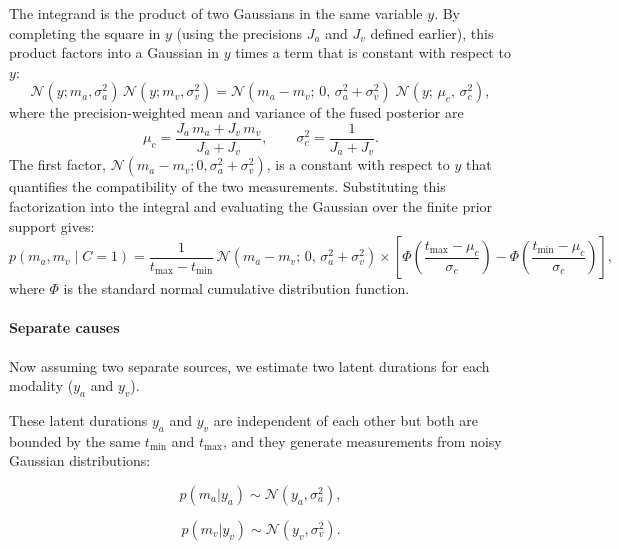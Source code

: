 \documentclass{jov}
\begin{document}
The integrand is the product of two Gaussians in the same variable $y$. By completing the square in $y$ (using the precisions $J_a$ and $J_v$ defined earlier), this product factors into a Gaussian in $y$ times a term that is constant with respect to $y$:
\begin{equation}
\label{eq:product_gaussians_factorization}
\mathcal{N}(y; m_a, \sigma_a^2)\, \mathcal{N}(y; m_v, \sigma_v^2) 
= \mathcal{N}(m_a - m_v;\, 0,\, \sigma_a^2 + \sigma_v^2)\;\mathcal{N}(y;\, \mu_c,\, \sigma_c^2),
\end{equation}
where the precision-weighted mean and variance of the fused posterior are
\begin{equation}
\mu_c = \frac{J_a\, m_a + J_v\, m_v}{J_a + J_v}, 
\qquad
\sigma_c^2 = \frac{1}{J_a + J_v}.
\end{equation}
The first factor, $\mathcal{N}(m_a - m_v; 0, \sigma_a^2 + \sigma_v^2)$, is a constant with respect to $y$ that quantifies the compatibility of the two measurements.  Substituting this factorization into the integral and evaluating the Gaussian over the finite prior support gives:
\begin{equation}
\label{eq:likelihood_c1_final}
p(m_a, m_v \mid C\!=\!1) = \frac{1}{t_{\max} - t_{\min}}\, \mathcal{N}(m_a - m_v;\, 0,\, \sigma_a^2 + \sigma_v^2) 
\times \left[\Phi\!\left(\frac{t_{\max} - \mu_c}{\sigma_c}\right) - \Phi\!\left(\frac{t_{\min} - \mu_c}{\sigma_c}\right)\right],
\end{equation}
where $\Phi$ is the standard normal cumulative distribution function.

\paragraph{Separate causes}

Now assuming two separate sources, we estimate two latent durations for each modality ($y_a$ and $y_v$).

These latent durations $y_a$ and $y_v$ are independent of each other but both are bounded by the same $t_{\min}$ and $t_{\max}$, and they generate measurements from noisy Gaussian distributions:

\begin{equation}
p(m_a | y_a) \sim \mathcal{N}(y_a, \sigma_a^2),
\end{equation}

\begin{equation}
p(m_v | y_v) \sim \mathcal{N}(y_v, \sigma_v^2).
\end{equation}
\end{document}
